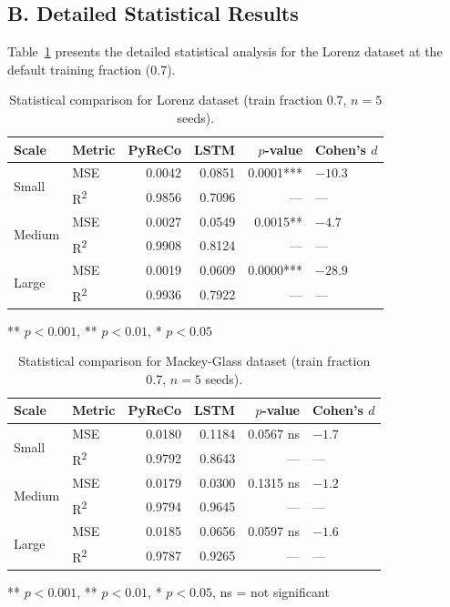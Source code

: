 \subsection*{B. Detailed Statistical Results}

Table~\ref{tab:stat_lorenz} presents the detailed statistical analysis for the Lorenz dataset at the default training fraction (0.7).

\begin{table}[H]
\centering
\caption{Statistical comparison for Lorenz dataset (train fraction 0.7, $n=5$ seeds).}
\label{tab:stat_lorenz}
\small
\begin{tabular}{@{}llrrrl@{}}
\toprule
Scale & Metric & PyReCo & LSTM & $p$-value & Cohen's $d$ \\
\midrule
\multirow{2}{*}{Small}
    & MSE  & 0.0042 & 0.0851 & 0.0001*** & $-10.3$ \\
    & R\textsuperscript{2} & 0.9856 & 0.7096 & --- & --- \\
\midrule
\multirow{2}{*}{Medium}
    & MSE  & 0.0027 & 0.0549 & 0.0015** & $-4.7$ \\
    & R\textsuperscript{2} & 0.9908 & 0.8124 & --- & --- \\
\midrule
\multirow{2}{*}{Large}
    & MSE  & 0.0019 & 0.0609 & 0.0000*** & $-28.9$ \\
    & R\textsuperscript{2} & 0.9936 & 0.7922 & --- & --- \\
\bottomrule
\end{tabular}

\vspace{0.3em}
\footnotesize *** $p<0.001$, ** $p<0.01$, * $p<0.05$
\end{table}

\begin{table}[H]
\centering
\caption{Statistical comparison for Mackey-Glass dataset (train fraction 0.7, $n=5$ seeds).}
\label{tab:stat_mg}
\small
\begin{tabular}{@{}llrrrl@{}}
\toprule
Scale & Metric & PyReCo & LSTM & $p$-value & Cohen's $d$ \\
\midrule
\multirow{2}{*}{Small}
    & MSE  & 0.0180 & 0.1184 & 0.0567 ns & $-1.7$ \\
    & R\textsuperscript{2} & 0.9792 & 0.8643 & --- & --- \\
\midrule
\multirow{2}{*}{Medium}
    & MSE  & 0.0179 & 0.0300 & 0.1315 ns & $-1.2$ \\
    & R\textsuperscript{2} & 0.9794 & 0.9645 & --- & --- \\
\midrule
\multirow{2}{*}{Large}
    & MSE  & 0.0185 & 0.0656 & 0.0597 ns & $-1.6$ \\
    & R\textsuperscript{2} & 0.9787 & 0.9265 & --- & --- \\
\bottomrule
\end{tabular}

\vspace{0.3em}
\footnotesize *** $p<0.001$, ** $p<0.01$, * $p<0.05$, ns = not significant
\end{table}

